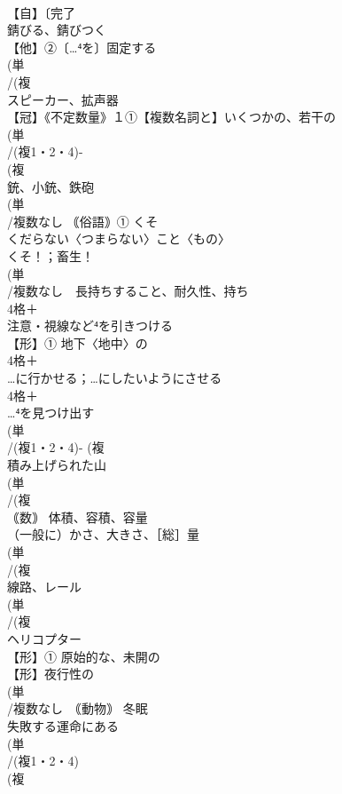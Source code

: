 \documentclass[8pt]{extreport}
\begin{document}
\begin{CJK}{UTF8}{min}
\\	【自】〔完了
\\	錆びる、錆びつく
\\	【他】②〔…⁴を〕固定する
\\	(単
\\	/(複
\\	スピーカー、拡声器
\\	【冠】《不定数量》１①【複数名詞と】いくつかの、若干の
\\	(単
\\	/(複1・2・4)-
\\	(複
\\	銃、小銃、鉄砲 
\\	(単
\\	/複数なし ｟俗語｠① くそ　
\\	くだらない〈つまらない〉こと〈もの〉　
\\	くそ！；畜生！
\\	(単
\\	/複数なし　長持ちすること、耐久性、持ち
\\	4格＋
\\	注意・視線など⁴を引きつける
\\	【形】① 地下〈地中〉の
\\	4格＋
\\	…に行かせる；…にしたいようにさせる
\\	4格＋
\\	…⁴を見つけ出す
\\	(単
\\	/(複1・2・4)- (複
\\	積み上げられた山 
\\	(単
\\	/(複
\\	｟数｠ 体積、容積、容量 
\\	（一般に）かさ、大きさ、［総］量
\\	(単
\\	/(複
\\	線路、レール
\\	(単
\\	/(複
\\	ヘリコプター
\\	【形】① 原始的な、未開の 
\\	【形】夜行性の
\\	(単
\\	/複数なし　｟動物｠ 冬眠
\\	失敗する運命にある
\\	(単
\\	/(複1・2・4)
\\	(複

\end{CJK}
\end{document}
